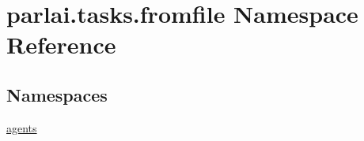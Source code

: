 \hypertarget{namespaceparlai_1_1tasks_1_1fromfile}{}\section{parlai.\+tasks.\+fromfile Namespace Reference}
\label{namespaceparlai_1_1tasks_1_1fromfile}
\subsection*{Namespaces}
\begin{DoxyCompactItemize}
\item 
 \hyperlink{namespaceparlai_1_1tasks_1_1fromfile_1_1agents}{agents}
\end{DoxyCompactItemize}
